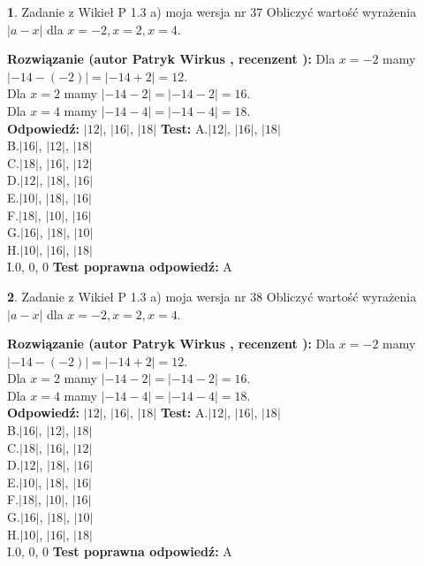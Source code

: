 \documentclass[12pt, a4paper]{article}
\theoremstyle{definition} %
\newtheorem{zad}{}
\newcommand{\zadStart}[1]{\begin{zad}#1\newline}
\newcommand{\zadStop}{\end{zad}}
\newcommand{\rozwStart}[2]{\noindent \textbf{Rozwiązanie (autor #1 , recenzent #2): }\newline}
\newcommand{\rozwStop}{\newline}
\newcommand{\odpStart}{\noindent \textbf{Odpowiedź:}\newline}
\newcommand{\odpStop}{\newline}
\newcommand{\testStart}{\noindent \textbf{Test:}\newline}
\newcommand{\testStop}{\newline}
\newcommand{\kluczStart}{\noindent \textbf{Test poprawna odpowiedź:}\newline}
\newcommand{\kluczStop}{\newline}
\begin{document}
\zadStart{Zadanie z Wikieł P 1.3 a) moja wersja nr 37}
Obliczyć wartość wyrażenia $|a - x|$ dla $x=-2,x=2,x=4$.
\zadStop
\rozwStart{Patryk Wirkus}{}
Dla $x = -2$ mamy $|-14 - (-2)| = |-14 + 2| = 12$.\\
Dla $x = 2$ mamy $|-14 - 2| = |-14 - 2| = 16$.\\
Dla $x = 4$ mamy $|-14 - 4| = |-14 - 4| = 18$.\\
\rozwStop
\odpStart
$|12|$, $|16|$, $|18|$
\odpStop
\testStart
A.$|12|$, $|16|$, $|18|$\\
B.$|16|$, $|12|$, $|18|$\\
C.$|18|$, $|16|$, $|12|$\\
D.$|12|$, $|18|$, $|16|$\\
E.$|10|$, $|18|$, $|16|$\\
F.$|18|$, $|10|$, $|16|$\\
G.$|16|$, $|18|$, $|10|$\\
H.$|10|$, $|16|$, $|18|$\\
I.$0$, $0$, $0$
\testStop
\kluczStart
A
\kluczStop



\zadStart{Zadanie z Wikieł P 1.3 a) moja wersja nr 38}
Obliczyć wartość wyrażenia $|a - x|$ dla $x=-2,x=2,x=4$.
\zadStop
\rozwStart{Patryk Wirkus}{}
Dla $x = -2$ mamy $|-14 - (-2)| = |-14 + 2| = 12$.\\
Dla $x = 2$ mamy $|-14 - 2| = |-14 - 2| = 16$.\\
Dla $x = 4$ mamy $|-14 - 4| = |-14 - 4| = 18$.\\
\rozwStop
\odpStart
$|12|$, $|16|$, $|18|$
\odpStop
\testStart
A.$|12|$, $|16|$, $|18|$\\
B.$|16|$, $|12|$, $|18|$\\
C.$|18|$, $|16|$, $|12|$\\
D.$|12|$, $|18|$, $|16|$\\
E.$|10|$, $|18|$, $|16|$\\
F.$|18|$, $|10|$, $|16|$\\
G.$|16|$, $|18|$, $|10|$\\
H.$|10|$, $|16|$, $|18|$\\
I.$0$, $0$, $0$
\testStop
\kluczStart
A
\kluczStop
\end{document}
